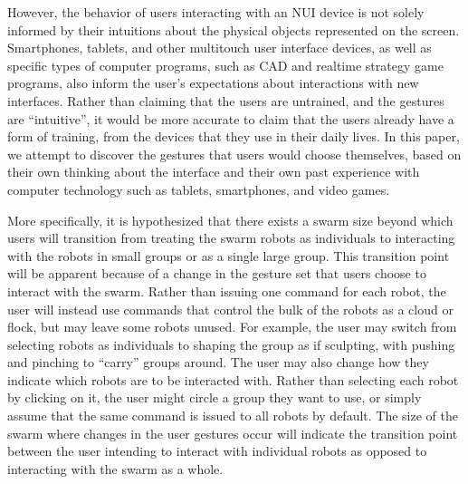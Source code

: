 However, the behavior of users interacting with an NUI device is not solely informed by their intuitions about the physical objects represented on the screen. 
Smartphones, tablets, and other multitouch user interface devices, as well as specific types of computer programs, such as CAD and realtime strategy game programs, also inform the user's expectations about interactions with new interfaces. 
Rather than claiming that the users are untrained, and the gestures are ``intuitive'', it would be more accurate to claim that the users already have a form of training, from the devices that they use in their daily lives. 
In this paper, we attempt to discover the gestures that users would choose themselves, based on their own thinking about the interface and their own past experience with computer technology such as tablets, smartphones, and video games. 


More specifically, it is hypothesized that there exists a swarm size beyond which users will transition from treating the swarm robots as individuals to interacting with the robots in small groups or as a single large group. 
This transition point will be apparent because of a change in the gesture set that users choose to interact with the swarm. 
Rather than issuing one command for each robot, the user will instead use commands that control the bulk of the robots as a cloud or flock, but may leave some robots unused. 
For example, the user may switch from selecting robots as individuals to shaping the group as if sculpting, with pushing and pinching to ``carry'' groups around. 
The user may also change how they indicate which robots are to be interacted with. 
Rather than selecting each robot by clicking on it, the user might circle a group they want to use, or simply assume that the same command is issued to all robots by default. 
The size of the swarm where changes in the user gestures occur will indicate the transition point between the user intending to interact with individual robots as opposed to interacting with the swarm as a whole. 


